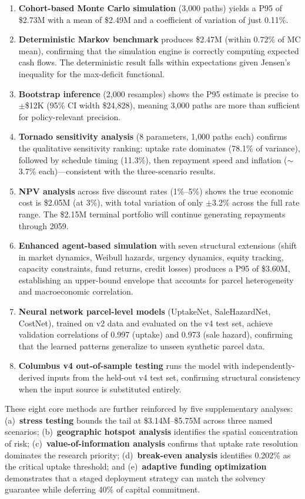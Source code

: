 \documentclass[11pt, letterpaper]{article}
\begin{document}
\begin{enumerate}[nosep]
  \item \textbf{Cohort-based Monte Carlo simulation} (3{,}000 paths) yields a P95 of \$2.73M with a mean of \$2.49M and a coefficient of variation of just 0.11\%.
  \item \textbf{Deterministic Markov benchmark} produces \$2.47M (within 0.72\% of MC mean), confirming that the simulation engine is correctly computing expected cash flows. The deterministic result falls within expectations given Jensen's inequality for the max-deficit functional.
  \item \textbf{Bootstrap inference} (2{,}000 resamples) shows the P95 estimate is precise to ${\pm}$\$12K (95\% CI width \$24{,}828), meaning 3{,}000 paths are more than sufficient for policy-relevant precision.
  \item \textbf{Tornado sensitivity analysis} (8 parameters, 1{,}000 paths each) confirms the qualitative sensitivity ranking: uptake rate dominates (78.1\% of variance), followed by schedule timing (11.3\%), then repayment speed and inflation (${\sim}$3.7\% each)---consistent with the three-scenario results.
  \item \textbf{NPV analysis} across five discount rates (1\%--5\%) shows the true economic cost is \$2.05M (at 3\%), with total variation of only ${\pm}$3.2\% across the full rate range. The \$2.15M terminal portfolio will continue generating repayments through 2059.
  \item \textbf{Enhanced agent-based simulation} with seven structural extensions (shift in market dynamics, Weibull hazards, urgency dynamics, equity tracking, capacity constraints, fund returns, credit losses) produces a P95 of \$3.60M, establishing an upper-bound envelope that accounts for parcel heterogeneity and macroeconomic correlation.
  \item \textbf{Neural network parcel-level models} (UptakeNet, SaleHazardNet, CostNet), trained on v2 data and evaluated on the v4 test set, achieve validation correlations of 0.997 (uptake) and 0.973 (sale hazard), confirming that the learned patterns generalize to unseen synthetic parcel data.
  \item \textbf{Columbus v4 out-of-sample testing} runs the model with independently-derived inputs from the held-out v4 test set, confirming structural consistency when the input source is substituted entirely.
\end{enumerate}

These eight core methods are further reinforced by five supplementary analyses: (a)~\textbf{stress testing} bounds the tail at \$3.14M--\$5.75M across three named scenarios; (b)~\textbf{geographic hotspot analysis} identifies the spatial concentration of risk; (c)~\textbf{value-of-information analysis} confirms that uptake rate resolution dominates the research priority; (d)~\textbf{break-even analysis} identifies 0.202\% as the critical uptake threshold; and (e)~\textbf{adaptive funding optimization} demonstrates that a staged deployment strategy can match the solvency guarantee while deferring 40\% of capital commitment.
\end{document}
